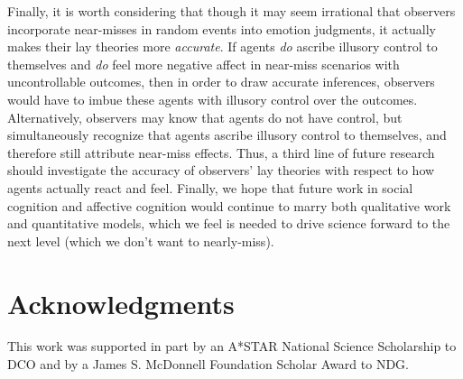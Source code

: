 \documentclass[10pt,letterpaper]{article}
\begin{document}
	Finally, it is worth considering that though it may seem irrational that observers incorporate near-misses in random events into emotion judgments, it actually makes their lay theories more \textit{accurate}. If agents \textit{do} ascribe illusory control to themselves and \textit{do} feel more negative affect in near-miss scenarios with uncontrollable outcomes, then in order to draw accurate inferences, observers would have to imbue these agents with illusory control over the outcomes. Alternatively, observers may know that agents do not have control, but simultaneously recognize that agents ascribe illusory control to themselves, and therefore still attribute near-miss effects. Thus, a third line of future research should investigate the accuracy of observers' lay theories with respect to how agents actually react and feel. Finally, we hope that future work in social cognition and affective cognition would continue to marry both qualitative work and quantitative models, which we feel is needed to drive science forward to the next level (which we don't want to nearly-miss).
	
	


\section{Acknowledgments}

This work was supported in part by an A*STAR National Science Scholarship to DCO and by a James S. McDonnell Foundation Scholar Award to NDG.




\setlength{\bibleftmargin}{.125in}
\setlength{\bibindent}{-\bibleftmargin}
\end{document}
